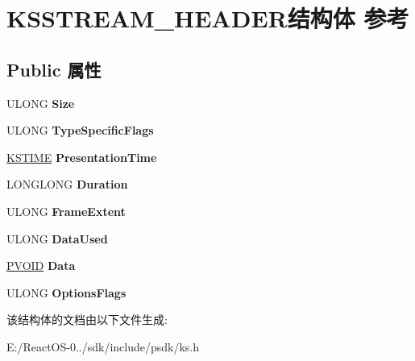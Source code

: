 \hypertarget{struct_k_s_s_t_r_e_a_m___h_e_a_d_e_r}{}\section{K\+S\+S\+T\+R\+E\+A\+M\+\_\+\+H\+E\+A\+D\+E\+R结构体 参考}
\label{struct_k_s_s_t_r_e_a_m___h_e_a_d_e_r}
\subsection*{Public 属性}
\begin{DoxyCompactItemize}
\item 
\mbox{\label{struct_k_s_s_t_r_e_a_m___h_e_a_d_e_r_a2763cce2aed94a0c37e6630595e3c86d}} 
U\+L\+O\+NG {\bfseries Size}
\item 
\mbox{\label{struct_k_s_s_t_r_e_a_m___h_e_a_d_e_r_aeca53d4cbd064803b36196b9f8f632da}} 
U\+L\+O\+NG {\bfseries Type\+Specific\+Flags}
\item 
\mbox{\label{struct_k_s_s_t_r_e_a_m___h_e_a_d_e_r_a5900b2557203944a2ba94ac03eb6e1f0}} 
\hyperlink{struct_k_s_t_i_m_e}{K\+S\+T\+I\+ME} {\bfseries Presentation\+Time}
\item 
\mbox{\label{struct_k_s_s_t_r_e_a_m___h_e_a_d_e_r_a85200c653a11bbc54bb73852980b6f5a}} 
L\+O\+N\+G\+L\+O\+NG {\bfseries Duration}
\item 
\mbox{\label{struct_k_s_s_t_r_e_a_m___h_e_a_d_e_r_a08a3f73cbe6d08bf63ecf08d75ac3a2d}} 
U\+L\+O\+NG {\bfseries Frame\+Extent}
\item 
\mbox{\label{struct_k_s_s_t_r_e_a_m___h_e_a_d_e_r_a848c0e966ba8bd1c3545121be62ca3a0}} 
U\+L\+O\+NG {\bfseries Data\+Used}
\item 
\mbox{\label{struct_k_s_s_t_r_e_a_m___h_e_a_d_e_r_a6f6127c73baaa7e612ffb3337f9024c8}} 
\hyperlink{interfacevoid}{P\+V\+O\+ID} {\bfseries Data}
\item 
\mbox{\label{struct_k_s_s_t_r_e_a_m___h_e_a_d_e_r_aa3c01e08df2301bcc31960826d9bf80f}} 
U\+L\+O\+NG {\bfseries Options\+Flags}
\end{DoxyCompactItemize}


该结构体的文档由以下文件生成\+:\begin{DoxyCompactItemize}
\item 
E\+:/\+React\+O\+S-\/0../sdk/include/psdk/ks.\+h\end{DoxyCompactItemize}
